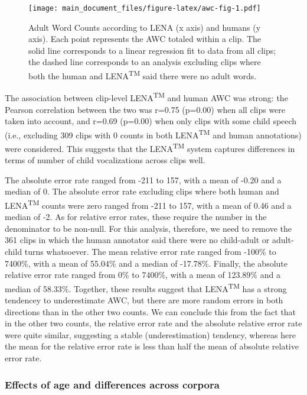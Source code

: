 \documentclass[english,floatsintext,man]{apa6}
\begin{document}
\begin{figure}
\centering
\texttt{[image: main\_document\_files/figure-latex/awc-fig-1.pdf]}
\caption{\label{fig:awc-fig}Adult Word Counts according to LENA (x axis) and
humans (y axis). Each point represents the AWC totaled within a clip.
The solid line corresponds to a linear regression fit to data from all
clips; the dashed line corresponds to an analysis excluding clips where
both the human and LENA\textsuperscript{TM} said there were no adult
words.}
\end{figure}

The association between clip-level LENA\textsuperscript{TM} and human
AWC was strong: the Pearson correlation between the two was r=0.75
(p=0.00) when all clips were taken into account, and r=0.69 (p=0.00)
when only clips with some child speech (i.e., excluding 309 clips with 0
counts in both LENA\textsuperscript{TM} and human annotations) were
considered. This suggests that the LENA\textsuperscript{TM} system
captures differences in terms of number of child vocalizations across
clips well.

The absolute error rate ranged from -211 to 157, with a mean of -0.20
and a median of 0. The absolute error rate excluding clips where both
human and LENA\textsuperscript{TM} counts were zero ranged from -211 to
157, with a mean of 0.46 and a median of -2. As for relative error
rates, these require the number in the denominator to be non-null. For
this analysis, therefore, we need to remove the 361 clips in which the
human annotator said there were no child-adult or adult-child turns
whatsoever. The mean relative error rate ranged from -100\% to 7400\%,
with a mean of 55.04\% and a median of -17.78\%. Finally, the absolute
relative error rate ranged from 0\% to 7400\%, with a mean of 123.89\%
and a median of 58.33\%. Together, these results suggest that
LENA\textsuperscript{TM} has a strong tendencey to underestimate AWC,
but there are more random errors in both directions than in the other
two counts. We can conclude this from the fact that in the other two
counts, the relative error rate and the absolute relative error rate
were quite similar, suggesting a stable (underestimation) tendency,
whereas here the mean for the relative error rate is less than half the
mean of absolute relative error rate.

\subsubsection{Effects of age and differences across
corpora}\label{effects-of-age-and-differences-across-corpora}
\end{document}
